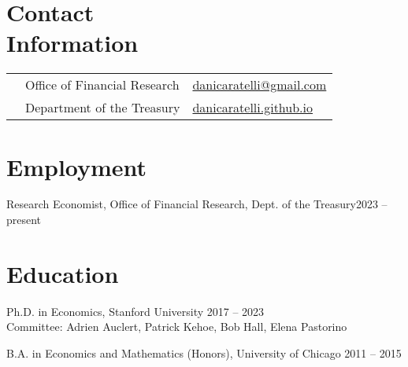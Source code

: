 \documentclass[margin,line]{res}                          %
\newenvironment{list1}{
	\begin{list}{\ding{113}}{%
			\setlength{\itemsep}{0in}
			\setlength{\parsep}{0in} \setlength{\parskip}{0in}
			\setlength{\topsep}{0in} \setlength{\partopsep}{0in}
			\setlength{\leftmargin}{0.17in}}}{\end{list}}
\begin{document}
	
	\begin{resume}
		\thispagestyle{plain} %
		
		\section{\sc Contact \\Information}
		\vspace{.05in}
		\begin{tabular}{@{}p{0.20in}p{2.75in}p{2.75in}}
			& Office of Financial Research      &\href{mailto:danicaratelli@gmail.com}{danicaratelli@gmail.com}
			\\    
			& Department of the Treasury  & \href{https://danicaratelli.github.io/}{danicaratelli.github.io}
		\end{tabular}

		\section{\sc Employment}
		\begin{list1}
			\item[] Research Economist, Office of Financial Research, Dept. of the Treasury\hfill 2023 -- present
		\end{list1}	
		
		\section{\sc Education}
		\begin{list1}
			\item[] Ph.D. in Economics, Stanford University \hfill 2017 -- 2023\\
			Committee: Adrien Auclert, Patrick Kehoe, Bob Hall, Elena Pastorino\smallskip
			\item[] B.A. in Economics and Mathematics (Honors), University of Chicago \hfill 2011 -- 2015
		\end{list1}
		

\end{resume}
\end{document}
